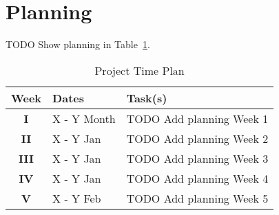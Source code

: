 \section{Planning}

TODO Show planning in Table~\ref{table:planning}.

\begin{table}[H]
\begin{tabular}{|c|l|l|}
\hline
\textbf{Week} & \textbf{Dates} & \textbf{Task(s)} \\ \hline
\textbf{I} & X - Y Month & TODO Add planning Week 1 \\ \hline
\textbf{II} & X - Y Jan & TODO Add planning Week 2 \\ \hline
\textbf{III} & X - Y Jan & TODO Add planning Week 3 \\ \hline
\textbf{IV} & X - Y Jan & TODO Add planning Week 4 \\ \hline
\textbf{V} & X - Y Feb & TODO Add planning Week 5 \\ \hline
\end{tabular}
\caption{Project Time Plan}
\label{table:planning}
\end{table}